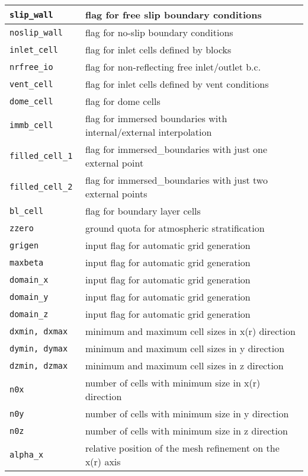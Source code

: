 \begin{tabular}{|p{6cm}|p{6cm}|}
\tt slip\_wall   & flag for free slip boundary conditions  \\ \hline
\tt noslip\_wall & flag for no-slip boundary conditions \\ \hline
\tt inlet\_cell  & flag for inlet cells defined by blocks \\ \hline
\tt nrfree\_io   & flag for non-reflecting free inlet/outlet b.c. \\ \hline
\tt vent\_cell   & flag for inlet cells defined by vent conditions \\ \hline
\tt dome\_cell   & flag for dome cells \\ \hline
\tt immb\_cell   & flag for immersed boundaries with internal/external interpolation \\ \hline
\tt filled\_cell\_1     & flag for immersed\_boundaries with just one external point \\ \hline
\tt filled\_cell\_2     & flag for immersed\_boundaries with just two external points \\ \hline
\tt bl\_cell     & flag for boundary layer cells \\ \hline
\tt zzero     & ground quota for atmospheric stratification \\ \hline
\tt grigen    & input flag for automatic grid generation\\ \hline
\tt maxbeta    & input flag for automatic grid generation\\ \hline
\tt domain\_x    & input flag for automatic grid generation\\ \hline
\tt domain\_y    & input flag for automatic grid generation\\ \hline
\tt domain\_z    & input flag for automatic grid generation\\ \hline
\tt dxmin, dxmax & minimum and maximum cell sizes in x(r) direction \\ \hline
\tt dymin, dymax & minimum and maximum cell sizes in y direction  \\ \hline
\tt dzmin, dzmax & minimum and maximum cell sizes in z direction  \\ \hline
\tt n0x    & number of cells with minimum size in x(r) direction \\ \hline
\tt n0y    & number of cells with minimum size in y direction \\ \hline
\tt n0z    & number of cells with minimum size in z direction\\ \hline
\tt alpha\_x    & relative position of the mesh refinement on the x(r) axis \\ \hline

\end{tabular}
